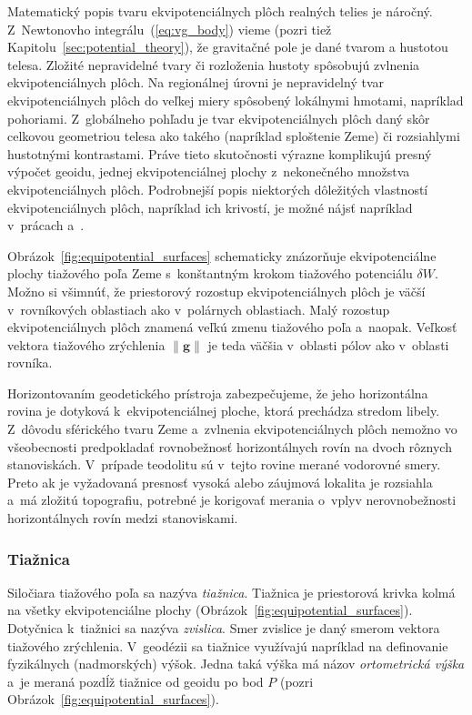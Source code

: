 \documentclass[a4paper,12pt]{book}
\let\vec\mathbf
\begin{document}
Matematický popis tvaru ekvipotenciálnych plôch realných telies je náročný.  
Z~Newtonovho integrálu~(\ref{eq:vg_body}) vieme (pozri tiež 
Kapitolu~\ref{sec:potential_theory}), že gravitačné pole je dané tvarom 
a hustotou telesa.  Zložité nepravidelné tvary či rozloženia hustoty spôsobujú 
zvlnenia ekvipotenciálnych plôch.  Na regionálnej úrovni je nepravidelný tvar 
ekvipotenciálnych plôch do veľkej miery spôsobený lokálnymi hmotami, napríklad 
pohoriami.  Z~globálneho pohľadu je tvar ekvipotenciálnych plôch daný skôr 
celkovou geometriou telesa ako takého (napríklad sploštenie Zeme) či 
rozsiahlymi hustotnými kontrastami.  Práve tieto skutočnosti výrazne komplikujú 
presný výpočet geoidu, jednej ekvipotenciálnej plochy z~nekonečného množstva 
ekvipotenciálnych plôch.  Podrobnejší popis niektorých dôležitých vlastností 
ekvipotenciálnych plôch, napríklad ich krivostí, je možné nájsť napríklad 
v~prácach \textcite{Janak2006} a~\textcite{MoritzPhysicalGeodesy}.

Obrázok~\ref{fig:equipotential_surfaces} schematicky znázorňuje ekvipotenciálne
plochy tiažového poľa Zeme s~konštantným krokom tiažového potenciálu $\delta
W$.  Možno si všimnúť, že priestorový rozostup ekvipotenciálnych plôch je väčší
v~rovníkových oblastiach ako v~polárnych oblastiach.  Malý rozostup
ekvipotenciálnych plôch znamená veľkú zmenu tiažového poľa a~naopak.  Veľkosť
vektora tiažového zrýchlenia $\| \vec g \|$ je teda väčšia v~oblasti pólov ako
v~oblasti rovníka.

Horizontovaním geodetického prístroja zabezpečujeme, že jeho horizontálna
rovina je dotyková k~ekvipotenciálnej ploche, ktorá prechádza stredom libely.
Z~dôvodu sférického tvaru Zeme a~zvlnenia ekvipotenciálnych plôch nemožno vo
všeobecnosti predpokladať rovnobežnosť horizontálnych rovín na dvoch rôznych
stanoviskách.  V~prípade teodolitu sú v~tejto rovine merané vodorovné smery.
Preto ak je vyžadovaná presnosť vysoká alebo záujmová lokalita je rozsiahla
a~má zložitú topografiu, potrebné je korigovať merania o~vplyv nerovnobežnosti
horizontálnych rovín medzi stanoviskami.

\subsubsection{Tiažnica}

Siločiara tiažového poľa sa nazýva \emph{tiažnica}.  Tiažnica je priestorová
krivka kolmá na všetky ekvipotenciálne plochy
(Obrázok~\ref{fig:equipotential_surfaces}).  Dotyčnica k~tiažnici sa nazýva
\emph{zvislica}.  Smer zvislice je daný smerom vektora tiažového zrýchlenia.
V~geodézii sa tiažnice využívajú napríklad na definovanie fyzikálnych
(nadmorských) výšok.  Jedna taká výška má názov \emph{ortometrická výška} a~je
meraná pozdĺž tiažnice od geoidu po bod $P$ (pozri
Obrázok~\ref{fig:equipotential_surfaces}).
\end{document}
